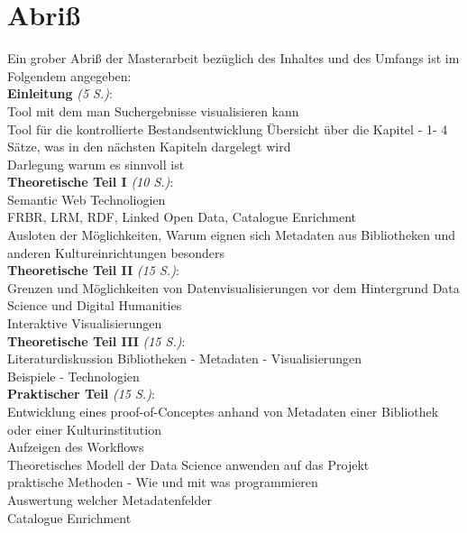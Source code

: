 \documentclass[10pt,a4paper,twocolumn,conference]{IEEEtran}
\begin{document}
\section{Abriß}
Ein grober Abriß der Masterarbeit bezüglich des Inhaltes und des Umfangs ist im
Folgendem angegeben:\\
\textbf{Einleitung} \textit{(5 S.)}:\\ Tool mit dem man Suchergebnisse visualisieren kann\\ Tool für die kontrollierte Bestandsentwicklung Übersicht über die Kapitel - 1- 4 Sätze, was in den nächsten Kapiteln dargelegt wird\\
            Darlegung warum es sinnvoll ist\\
            \textbf{Theoretische Teil I} \textit{(10 S.)}:\\
            Semantic Web Technoliogien\\
            FRBR, LRM, RDF, Linked Open Data, Catalogue Enrichment\\
            Ausloten der Möglichkeiten, Warum eignen sich Metadaten aus Bibliotheken und anderen Kultureinrichtungen besonders\\
\textbf{Theoretische Teil II} \textit{(15 S.)}:\\
            Grenzen und Möglichkeiten von Datenvisualisierungen vor dem
            Hintergrund Data Science und Digital Humanities\\
            Interaktive Visualisierungen\\ \textbf{Theoretische Teil III} \textit{(15 S.)}:\\
            Literaturdiskussion Bibliotheken - Metadaten - Visualisierungen\\
            Beispiele - Technologien\\
\textbf{Praktischer Teil} \textit{(15 S.)}:\\
            Entwicklung eines proof-of-Conceptes anhand von Metadaten einer
            Bibliothek oder einer Kulturinstitution\\
            Aufzeigen des Workflows\\
            Theoretisches Modell der Data Science anwenden auf das Projekt\\
            praktische Methoden - Wie und mit was programmieren\\
            Auswertung welcher Metadatenfelder\\
            Catalogue Enrichment

            
            

 
\end{document}

